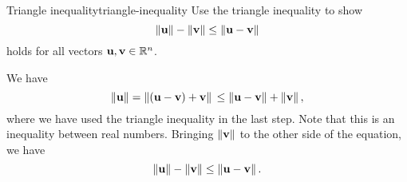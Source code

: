 \begin{example}{Triangle inequality}{triangle-inequality}
  Use the triangle inequality to show
  \begin{equation*}
    \norm{\vect{u}} -\norm{\vect{v}} \leq \norm{\vect{u}-\vect{v}}
  \end{equation*}
  holds for all vectors $\vect{u},\vect{v}\in\R^n$.
\end{example}

\begin{solution}
  We have
  \begin{equation*}
    \norm{\vect{u}}
    = \norm{(\vect{u}-\vect{v})+\vect{v}} \\
    \leq \norm{\vect{u}-\vect{v}}+\norm{\vect{v}},
  \end{equation*}
  where we have used the triangle inequality in the last step. Note
  that this is an inequality between real numbers. Bringing
  $\norm{\vect{v}}$ to the other side of the equation, we have
  \begin{equation*}
    \norm{\vect{u}} - \norm{\vect{v}} \leq \norm{\vect{u}-\vect{v}}.
  \end{equation*}
\end{solution}
